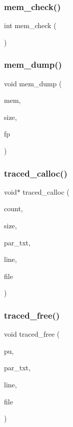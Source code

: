 \subsubsection{mem\+\_\+check()}
{\footnotesize\ttfamily int mem\+\_\+check (\begin{DoxyParamCaption}\item[{void}]{ }\end{DoxyParamCaption})}

\mbox{\label{memtrace_8cpp_a031b528c007e2e8ba5d814be13d3860c}} 
\subsubsection{mem\+\_\+dump()}
{\footnotesize\ttfamily void mem\+\_\+dump (\begin{DoxyParamCaption}\item[{void const $\ast$}]{mem,  }\item[{size\+\_\+t}]{size,  }\item[{F\+I\+LE $\ast$}]{fp }\end{DoxyParamCaption})}

\mbox{\label{memtrace_8cpp_a68998093ee624349c5cab1aab7bc915f}} 
\subsubsection{traced\+\_\+calloc()}
{\footnotesize\ttfamily void$\ast$ traced\+\_\+calloc (\begin{DoxyParamCaption}\item[{size\+\_\+t}]{count,  }\item[{size\+\_\+t}]{size,  }\item[{const char $\ast$}]{par\+\_\+txt,  }\item[{int}]{line,  }\item[{const char $\ast$}]{file }\end{DoxyParamCaption})}

\mbox{\label{memtrace_8cpp_a1f2006cf357ea01179f18a5c965ff105}} 
\subsubsection{traced\+\_\+free()}
{\footnotesize\ttfamily void traced\+\_\+free (\begin{DoxyParamCaption}\item[{void $\ast$}]{pu,  }\item[{const char $\ast$}]{par\+\_\+txt,  }\item[{int}]{line,  }\item[{const char $\ast$}]{file }\end{DoxyParamCaption})}

